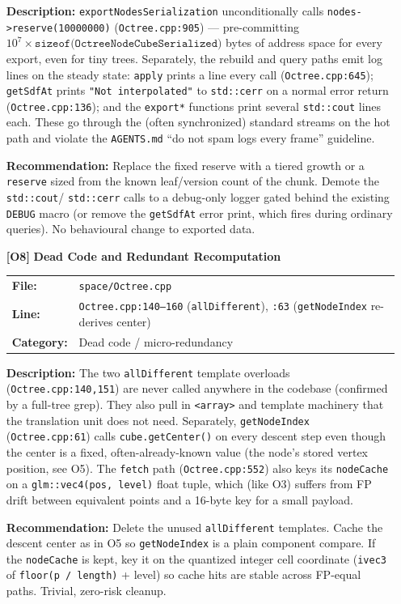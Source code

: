 \documentclass[a4paper,12pt]{article}
\newcommand{\severitybox}[2]{%
  \colorbox{#1}{\makebox[2.5cm][c]{\textcolor{white}{\textbf{#2}}}}%
}
\begin{document}
\begin{enumerate}[leftmargin=*]
  \textbf{Description:}
  \texttt{exportNodesSerialization} unconditionally calls
  \texttt{nodes->reserve(10000000)} (\texttt{Octree.cpp:905}) — pre-committing
  $10^7 \times \texttt{sizeof(OctreeNodeCubeSerialized)}$ bytes of address space for
  every export, even for tiny trees. Separately, the rebuild and query paths emit
  log lines on the steady state: \texttt{apply} prints a line every call
  (\texttt{Octree.cpp:645}); \texttt{getSdfAt} prints \texttt{"Not interpolated"}
  to \texttt{std::cerr} on a normal error return (\texttt{Octree.cpp:136}); and the
  \texttt{export*} functions print several \texttt{std::cout} lines each. These go
  through the (often synchronized) standard streams on the hot path and violate the
  \texttt{AGENTS.md} ``do not spam logs every frame'' guideline.

  \textbf{Recommendation:}
  Replace the fixed reserve with a tiered growth or a \texttt{reserve} sized from
  the known leaf/version count of the chunk. Demote the \texttt{std::cout}/
  \texttt{std::cerr} calls to a debug-only logger gated behind the existing
  \texttt{DEBUG} macro (or remove the \texttt{getSdfAt} error print, which fires
  during ordinary queries). No behavioural change to exported data.

\item[\textbf{[O8]}] \textbf{Dead Code and Redundant Recomputation}
  \hfill \severitybox{lowcolor}{LOW}

  \begin{tabular}{ll}
    \textbf{File:} & \texttt{space/Octree.cpp} \\
    \textbf{Line:} & \texttt{Octree.cpp:140--160} (\texttt{allDifferent}),
                      \texttt{:63} (\texttt{getNodeIndex} re-derives center) \\
    \textbf{Category:} & Dead code / micro-redundancy \\
  \end{tabular}

  \textbf{Description:}
  The two \texttt{allDifferent} template overloads (\texttt{Octree.cpp:140,151})
  are never called anywhere in the codebase (confirmed by a full-tree grep). They
  also pull in \texttt{<array>} and template machinery that the translation unit
  does not need. Separately, \texttt{getNodeIndex} (\texttt{Octree.cpp:61}) calls
  \texttt{cube.getCenter()} on every descent step even though the center is a
  fixed, often-already-known value (the node's stored vertex position, see O5).
  The \texttt{fetch} path (\texttt{Octree.cpp:552}) also keys its
  \texttt{nodeCache} on a \texttt{glm::vec4(pos, level)} float tuple, which (like
  O3) suffers from FP drift between equivalent points and a 16-byte key for a small
  payload.

  \textbf{Recommendation:}
  Delete the unused \texttt{allDifferent} templates. Cache the descent center as in
  O5 so \texttt{getNodeIndex} is a plain component compare. If the
  \texttt{nodeCache} is kept, key it on the quantized integer cell coordinate
  (\texttt{ivec3} of \texttt{floor(p / length)} + level) so cache hits are stable
  across FP-equal paths. Trivial, zero-risk cleanup.

\end{enumerate}
\end{document}
